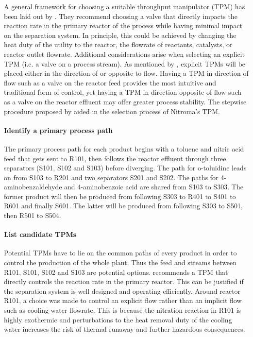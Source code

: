 A general framework for choosing a suitable throughput manipulator (TPM) has been laid out by \textcite{}. They recommend choosing a valve that directly impacts the reaction rate in the primary reactor of the process while having minimal impact on the separation system. In principle, this could be achieved by changing the heat duty of the utility to the reactor, the flowrate of reactants, catalysts, or reactor outlet flowrate. Additional considerations arise when selecting an explicit TPM (i.e. a valve on a process stream). As mentioned by \textcite{}, explicit TPMs will be placed either in the direction of or opposite to flow. Having a TPM in direction of flow such as a valve on the reactor feed provides the most intuitive and traditional form of control, yet having a TPM in direction opposite of flow such as a valve on the reactor effluent may offer greater process stability. The stepwise procedure proposed by \textcite{} aided in the selection process of Nitroma's TPM. 

\paragraph{Identify a primary process path}
The primary process path for each product begins with a toluene and nitric acid feed that gets sent to R101, then follows the reactor effluent through three separators (S101, S102 and S103) before diverging. The path for o-toluidine leads on from S103 to R201 and two separators S201 and S202. The paths for 4-aminobenzaldehyde and 4-aminobenzoic acid are shared from S103 to S303. The former product will then be produced from following S303 to R401 to S401 to R601 and finally S601. The latter will be produced from following S303 to S501, then R501 to S504.  

\paragraph{List candidate TPMs}
Potential TPMs have to lie on the common paths of every product in order to control the production of the whole plant. Thus the feed and streams between R101, S101, S102 and S103 are potential options. \textcite{} recommends a TPM that directly controls the reaction rate in the primary reactor. This can be justified if the separation system is well designed and operating efficiently. Around reactor R101, a choice was made to control an explicit flow rather than an implicit flow such as cooling water flowrate. This is because the nitration reaction in R101 is highly exothermic and perturbations to the heat removal duty of the cooling water increases the risk of thermal runaway and further hazardous consequences. 

